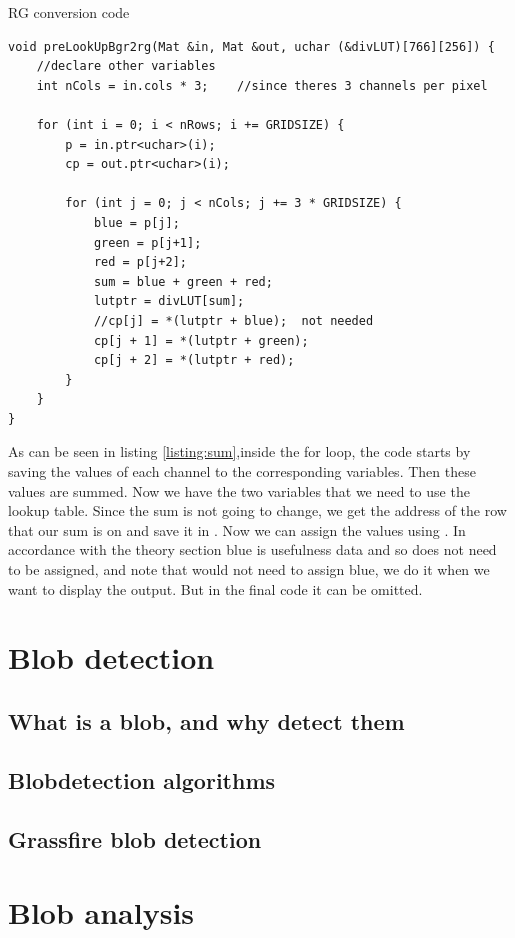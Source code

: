 \begin{listing}[H]
	\caption{RG conversion code}
	\label{listing:sum}
	\begin{verbatim}
void preLookUpBgr2rg(Mat &in, Mat &out, uchar (&divLUT)[766][256]) {
	//declare other variables
	int nCols = in.cols * 3;	//since theres 3 channels per pixel
	
	for (int i = 0; i < nRows; i += GRIDSIZE) {
		p = in.ptr<uchar>(i);
		cp = out.ptr<uchar>(i);
		
		for (int j = 0; j < nCols; j += 3 * GRIDSIZE) {
			blue = p[j];
			green = p[j+1];
			red = p[j+2];
			sum = blue + green + red;
			lutptr = divLUT[sum];
			//cp[j] = *(lutptr + blue);  not needed
			cp[j + 1] = *(lutptr + green);
			cp[j + 2] = *(lutptr + red);
		}
	}
}
	\end{verbatim}
\end{listing}
As can be seen in listing \ref{listing:sum},inside the for loop, the code starts by saving the values of each channel to the corresponding variables. Then these values are summed. Now we have the two variables that we need to use the lookup table. Since the sum is not going to change, we get the address of the row that our sum is on and save it in . Now we can assign the values using . In accordance with the theory section blue is usefulness data and so does not need to be assigned, and note that would not need to assign blue, we do it when we want to display the output. But in the final code it can be omitted.

\section{Blob detection}

\subsection{What is a blob, and why detect them}
\subsection{Blobdetection algorithms}
\subsection{Grassfire blob detection}

\section{Blob analysis}
